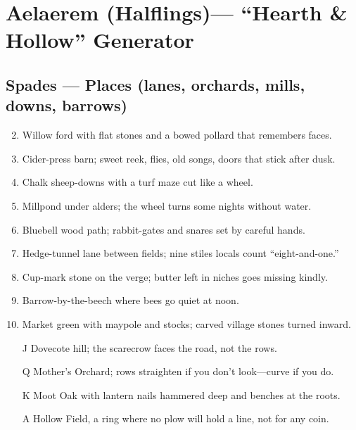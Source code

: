 \chapter{Aelaerem (Halflings)--- ``Hearth \& Hollow'' Generator}
\label{chap:aelaerem}

\section*{Spades --- Places (lanes, orchards, mills, downs, barrows)}
\label{sec:aelaerem-places}
\begin{enumerate}
\setcounter{enumi}{1}
\item Willow ford with flat stones and a bowed pollard that remembers faces.
\item Cider-press barn; sweet reek, flies, old songs, doors that stick after dusk.
\item Chalk sheep-downs with a turf maze cut like a wheel.
\item Millpond under alders; the wheel turns some nights without water.
\item Bluebell wood path; rabbit-gates and snares set by careful hands.
\item Hedge-tunnel lane between fields; nine stiles locals count ``eight-and-one.''
\item Cup-mark stone on the verge; butter left in niches goes missing kindly.
\item Barrow-by-the-beech where bees go quiet at noon.
\item Market green with maypole and stocks; carved village stones turned inward.
\item[J] Dovecote hill; the scarecrow faces the road, not the rows.
\item[Q] Mother's Orchard; rows straighten if you don't look---curve if you do.
\item[K] Moot Oak with lantern nails hammered deep and benches at the roots.
\item[A] Hollow Field, a ring where no plow will hold a line, not for any coin.
\end{enumerate}

